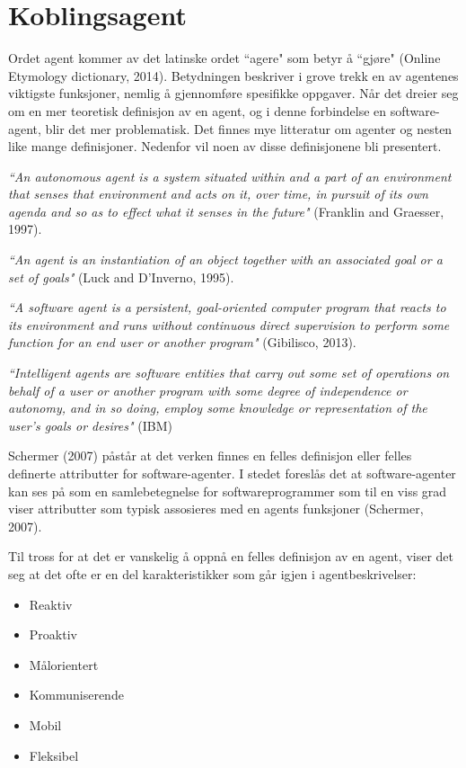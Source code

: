 \section{Koblingsagent}
Ordet agent kommer av det latinske ordet ``agere" som betyr å ``gjøre" (Online Etymology dictionary, 2014). Betydningen beskriver i grove trekk en av agentenes viktigste funksjoner, nemlig å gjennomføre spesifikke oppgaver. Når det dreier seg om en mer teoretisk definisjon av en agent, og i denne forbindelse en software-agent, blir det mer problematisk. Det finnes mye litteratur om agenter og nesten like mange definisjoner. Nedenfor vil noen av disse definisjonene bli presentert.

\textit{``An autonomous agent is a system situated within and a part of an environment
that senses that environment and acts on it, over time, in pursuit of its own agenda
and so as to effect what it senses in the future"} (Franklin and Graesser, 1997).

\textit{``An agent is an instantiation of an object together with an associated goal or a set of goals"} (Luck and D'Inverno, 1995).

\textit{``A software agent is a persistent, goal-oriented computer program that reacts to its environment and runs without continuous direct supervision to perform some function for an end user or another program"} (Gibilisco, 2013).

\textit{``Intelligent agents are software entities that carry out some set of operations on behalf of a user or another program with some degree of independence or autonomy, and in so doing,
employ some knowledge or representation of the user's goals or desires"} (IBM)

Schermer (2007) påstår at det verken finnes en felles definisjon eller felles definerte attributter for software-agenter. I stedet foreslås det at software-agenter kan ses på som en samlebetegnelse for softwareprogrammer som til en viss grad viser attributter som typisk assosieres med en agents funksjoner (Schermer, 2007).

Til tross for at det er vanskelig å oppnå en felles definisjon av en agent, viser det seg at det ofte er en del karakteristikker som går igjen i agentbeskrivelser:
\begin{itemize}
\item Reaktiv
\item Proaktiv
\item Målorientert
\item Kommuniserende
\item Mobil
\item Fleksibel
\end{itemize}

